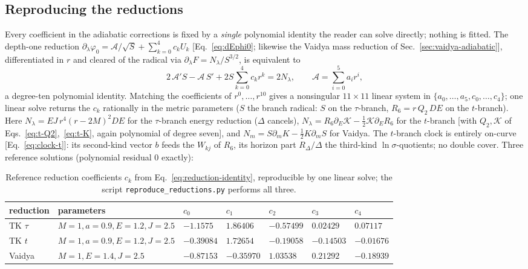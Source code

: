 \documentclass[
    aps, prd, twocolumn, superscriptaddress,
    showpacs, nofootinbib, floatfix
]{revtex4-2}
\begin{document}
\subsection{Reproducing the reductions}
\label{app:reproduce}
Every coefficient in the adiabatic corrections is fixed by a \emph{single}
polynomial identity the reader can solve directly; nothing is fitted. The depth-one
reduction $\partial_\lambda\varphi_0=\mathcal{A}/\sqrt S+\sum_{k=0}^4 c_k U_k$
[Eq.~\eqref{eq:dEphi0}; likewise the Vaidya mass reduction of
Sec.~\ref{sec:vaidya-adiabatic}], differentiated in $r$ and cleared of the radical
via $\partial_\lambda F=N_\lambda/S^{3/2}$, is equivalent to
\begin{equation}
    2\,\mathcal{A}'S-\mathcal{A}\,S'+2S\sum_{k=0}^4 c_k r^k=2N_\lambda,
    \qquad \mathcal{A}=\sum_{i=0}^5 a_i r^i,
    \label{eq:reduction-identity}
\end{equation}
a degree-ten polynomial identity. Matching the coefficients of $r^0,\dots,r^{10}$
gives a nonsingular $11\times11$ linear system in $\{a_0,\dots,a_5,c_0,\dots,c_4\}$;
one linear solve returns the $c_k$ rationally in the metric parameters ($S$ the
branch radical: $S$ on the $\tau$-branch, $R_6=r\,Q_2\,DE$ on the $t$-branch). Here
$N_\lambda=EJ\,r^4(r-2M)^2 DE$ for the $\tau$-branch energy reduction ($\Delta$
cancels), $N_\lambda=R_6\partial_E\mathcal K-\tfrac12\mathcal K\partial_E R_6$ for
the $t$-branch [with $Q_2,\mathcal K$ of Eqs.~\eqref{eq:t-Q2},~\eqref{eq:t-K}, again
polynomial of degree seven], and $N_m=S\partial_m K-\tfrac12K\partial_m S$ for
Vaidya. The $t$-branch clock is entirely on-curve [Eq.~\eqref{eq:clock-t}]: its
second-kind vector $b$ feeds the $W_{kj}$ of $R_6$, its horizon part
$R_\Delta/\Delta$ the third-kind $\ln\sigma$-quotients; no double cover. Three
reference solutions (polynomial residual $0$ exactly):
\begin{table}[t]
    \centering
    \caption{Reference reduction coefficients $c_k$ from
    Eq.~\eqref{eq:reduction-identity}, reproducible by one linear solve; the script
    \texttt{reproduce\_reductions.py} performs all three.}
    \label{tab:reduction-ck}
    \begin{ruledtabular}
    \begin{tabular}{lllllll}
        reduction & parameters & $c_0$ & $c_1$ & $c_2$ & $c_3$ & $c_4$\\
        \hline
        TK $\tau$ & $M{=}1,a{=}0.9,E{=}1.2,J{=}2.5$
            & $-1.1575$ & $1.86406$ & $-0.57499$ & $0.02429$ & $0.07117$\\
        TK $t$ & $M{=}1,a{=}0.9,E{=}1.2,J{=}2.5$
            & $-0.39084$ & $1.72654$ & $-0.19058$ & $-0.14503$ & $-0.01676$\\
        Vaidya & $M{=}1,E{=}1.4,J{=}2.5$
            & $-0.87153$ & $-0.35970$ & $1.03538$ & $0.21292$ & $-0.18939$\\
    \end{tabular}
    \end{ruledtabular}
\end{table}
\end{document}
